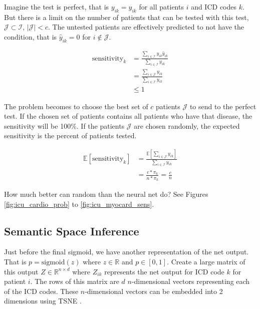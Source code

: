 Imagine the test is perfect, that is $y_{ik} = \hat{y}_{ik}$ for all patients $i$ and ICD codes $k$.  But there is a limit on the number of patients that can be tested with this test, $\mathcal{J} \subset \mathcal{I}$, $|\mathcal{J}| < c$.  The untested patients are effectively predicted to not have the condition, that is $\hat{y}_{ik} = 0$ for $i \notin \mathcal{J}$.

\begin{align}
    \text{sensitivity}_k 
        &= \frac
            {\sum_{i \in \mathcal{I}} y_{ik} \hat{y}_{ik}}
            {\sum_{i \in \mathcal{I}} y_{ik}} \\
        &= \frac
            {\sum_{i \in \mathcal{J}} y_{ik}}
            {\sum_{i \in \mathcal{I}} y_{ik}} \\
        &\leq 1
\end{align}

The problem becomes to choose the best set of $c$ patients $\mathcal{J}$ to send to the perfect test.  If the chosen set of patients contains all patients who have that disease, the sensitivity will be 100\%. If the patients $\mathcal{J}$ are chosen randomly, the expected sensitivity is the percent of patients tested.

\begin{align}
    \mathbb{E}[\text{sensitivity}_k]
        &= \frac
            {\mathbb{E}[\sum_{i \in \mathcal{J}} y_{ik}]}
            {\sum_{i \in \mathcal{I}} y_{ik}} \\
        &= \frac{c * \pi_k}{n * \pi_k} = \frac{c}{n}
\end{align}

How much better can random than the neural net do?  See Figures \ref{fig:icu_cardio_prob} to \ref{fig:icu_myocard_sens}.


\subsection{Semantic Space Inference}

Just before the final sigmoid, we have another representation of the net output.  That is $p = \text{sigmoid}(z)$ where $z \in \mathbb{R}$ and $p \in [0, 1]$.  Create a large matrix of this output $Z \in \mathbb{R}^{n \times d}$ where $Z_{ik}$ represents the net output for ICD code $k$ for patient $i$.  The rows of this matrix are $d$ $n$-dimensional vectors representing each of the ICD codes.  These $n$-dimensional vectors can be embedded into 2 dimensions using TSNE \cite{van2008visualizing}.

